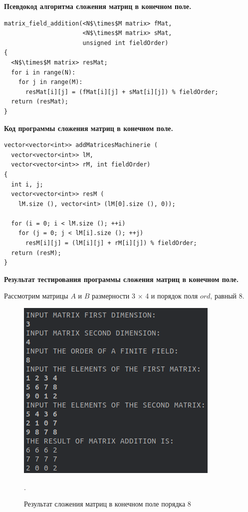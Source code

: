 \documentclass[spec, och, otchet, hidelinks]{SCWorks}
\newcommand{\tbf}[1]{\textbf{#1}}
\begin{document}
\par \tbf{Псевдокод алгоритма сложения матриц в конечном поле.}
\begin{lstlisting}[caption=Псевдокод алгоритма., mathescape]
matrix_field_addition(<N$\times$M matrix> fMat,
                      <N$\times$M matrix> sMat,
                      unsigned int fieldOrder)
{
  <N$\times$M matrix> resMat;
  for i in range(N):
    for j in range(M):
      resMat[i][j] = (fMat[i][j] + sMat[i][j]) % fieldOrder;
  return (resMat);
}
\end{lstlisting}

\par \tbf{Код программы сложения матриц в конечном поле.}
\begin{lstlisting}[caption=Код программы., mathescape]
vector<vector<int>> addMatricesMachinerie (
  vector<vector<int>> lM,
  vector<vector<int>> rM, int fieldOrder)
{
  int i, j;
  vector<vector<int>> resM (
    lM.size (), vector<int> (lM[0].size (), 0));

  for (i = 0; i < lM.size (); ++i)
    for (j = 0; j < lM[i].size (); ++j)
      resM[i][j] = (lM[i][j] + rM[i][j]) % fieldOrder;
  return (resM);
}
\end{lstlisting}

\par \tbf{Результат тестирования программы сложения матриц в конечном поле.}

\par Рассмотрим матрицы $A$ и $B$ размерности 3 $\times$ 4 и порядок поля $ord$,
равный 8.

\begin{figure}[h]
  \center\includegraphics[scale=0.7]{matrix_field_addition.png}
  \caption{Результат сложения матриц в конечном поле порядка 8}.
\end{figure}
\end{document}
